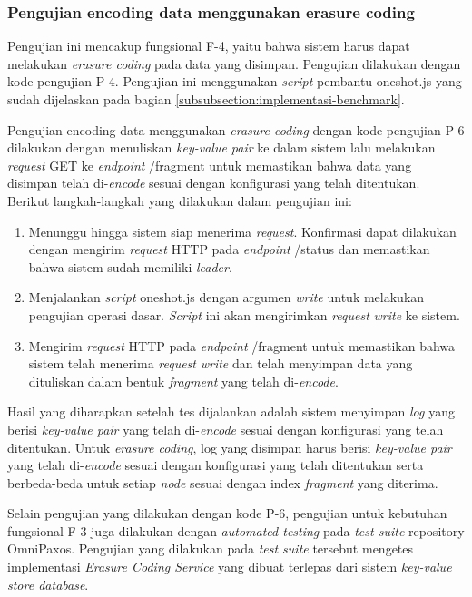 \subsubsection{Pengujian encoding data menggunakan erasure coding}
\label{subsubsection:pengujian-encoding-data-erasure-coding}

Pengujian ini mencakup fungsional F-4, yaitu bahwa sistem harus dapat melakukan \textit{erasure coding} pada data yang disimpan. Pengujian dilakukan dengan kode pengujian P-4. Pengujian ini menggunakan \textit{script} pembantu oneshot.js yang sudah dijelaskan pada bagian \ref{subsubsection:implementasi-benchmark}.

Pengujian encoding data menggunakan \textit{erasure coding} dengan kode pengujian P-6 dilakukan dengan menuliskan \textit{key-value pair} ke dalam sistem lalu melakukan \textit{request} GET ke \textit{endpoint} /fragment untuk memastikan bahwa data yang disimpan telah di-\textit{encode} sesuai dengan konfigurasi yang telah ditentukan. Berikut langkah-langkah yang dilakukan dalam pengujian ini:

\begin{enumerate}
  \item Menunggu hingga sistem siap menerima \textit{request}. Konfirmasi dapat dilakukan dengan mengirim \textit{request} HTTP pada \textit{endpoint} /status dan memastikan bahwa sistem sudah memiliki \textit{leader}.
  \item Menjalankan \textit{script} oneshot.js dengan argumen \textit{write} untuk melakukan pengujian operasi dasar. \textit{Script} ini akan mengirimkan \textit{request} \textit{write} ke sistem.
  \item Mengirim \textit{request} HTTP pada \textit{endpoint} /fragment untuk memastikan bahwa sistem telah menerima \textit{request} \textit{write} dan telah menyimpan data yang dituliskan dalam bentuk \textit{fragment} yang telah di-\textit{encode}.
\end{enumerate}

Hasil yang diharapkan setelah tes dijalankan adalah sistem menyimpan \textit{log} yang berisi \textit{key-value pair} yang telah di-\textit{encode} sesuai dengan konfigurasi yang telah ditentukan. Untuk \textit{erasure coding}, log yang disimpan harus berisi \textit{key-value pair} yang telah di-\textit{encode} sesuai dengan konfigurasi yang telah ditentukan serta berbeda-beda untuk setiap \textit{node} sesuai dengan index \textit{fragment} yang diterima.

Selain pengujian yang dilakukan dengan kode P-6, pengujian untuk kebutuhan fungsional F-3 juga dilakukan dengan \textit{automated testing} pada \textit{test suite} repository OmniPaxos. Pengujian yang dilakukan pada \textit{test suite} tersebut mengetes implementasi \textit{Erasure Coding Service} yang dibuat terlepas dari sistem \textit{key-value store database}.